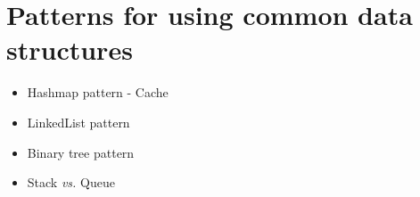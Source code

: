 
\chapter{Patterns for using common data structures} \label{ch:ds}

\begin{itemize}
    \item Hashmap pattern - Cache
    \item LinkedList pattern
    \item Binary tree pattern
    \item Stack \textit{vs.} Queue
\end{itemize}
